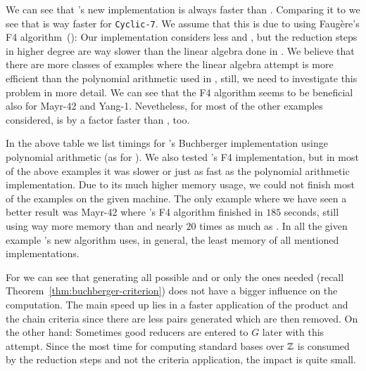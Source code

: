 We can see that \singular's new implementation is always faster than \macaulay.
Comparing it to \magma we see that \magma is way faster for \texttt{Cyclic-7}.
We assume that this is due to \magma using Faug\`ere's F4
algorithm~(\cite{fF41999}): Our implementation considers less \spts and \gpts, but
the reduction steps in higher degree are way slower than the linear algebra done
in \magma. We believe that there are more classes of examples where the linear
algebra attempt is more efficient than the polynomial arithmetic used in
\singular, still, we need to investigate this problem in more detail. We can see
that the F4 algorithm seems to be beneficial also for Mayr-42 and Yang-1.
Nevetheless, for most of the other examples considered, \singular is by a
factor faster than \magma, too.

In the above table we list timings for \macaulay's Buchberger implementation
usinge polynomial arithmetic (as for \singular).
We also tested \macaulay's F4 implementation, but in most of the above examples
it was slower or just as fast as the polynomial arithmetic implementation. Due
to its much higher memory usage, we could not finish most of the examples on the
given machine. The only example where we have seen a better result was Mayr-42
where \macaulay's F4 algorithm finished in $185$ seconds, still using way more
memory than \magma and nearly $20$ times as much as \singular. In all the given
example \singular's new algorithm uses, in general, the least memory of all
mentioned implementations.

For \singular we can see that generating all possible \spts and \gpts or only
the ones needed (recall Theorem~\ref{thm:buchberger-criterion}) does not have a
bigger influence on the computation. The main speed up lies in a faster
application of the product and the chain criteria since there are less pairs
generated which are then removed. On the other hand: Sometimes good reducers
are entered to $G$ later with this attempt. Since the most time for computing
standard bases over $\mathbb{Z}$ is consumed by the reduction steps and not the
criteria application, the impact is quite small.
